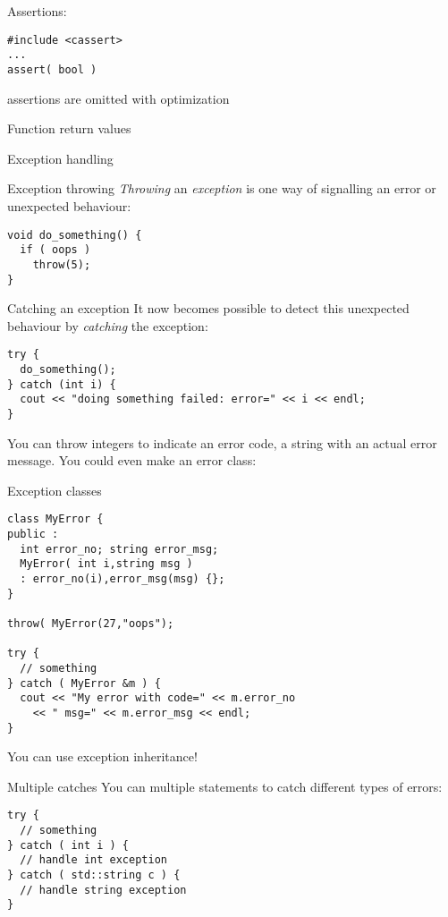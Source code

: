 Assertions:
\begin{verbatim}
#include <cassert>
...
assert( bool )
\end{verbatim}
assertions are omitted with optimization

Function return values

 {Exception handling}

\begin{block}{Exception throwing}
  \label{sl:exception-throw}
  \emph{Throwing} an \emph{exception}%
   is one way of signalling an error or
  unexpected behaviour:
\begin{verbatim}
void do_something() {
  if ( oops )
    throw(5);
}
\end{verbatim}
\end{block}

\begin{block}{Catching an exception}
  \label{sl:exception-catch}
  It now becomes possible to detect this unexpected behaviour by
  \emph{catching}
  the exception:
\begin{verbatim}
try {
  do_something();
} catch (int i) {
  cout << "doing something failed: error=" << i << endl;
}
\end{verbatim}
\end{block}

You can throw integers to indicate an error code, a string with an
actual error message. You could even make an error class:

\begin{block}{Exception classes}
  \label{sl:exception-class}
\begin{verbatim}
class MyError {
public :
  int error_no; string error_msg;
  MyError( int i,string msg )
  : error_no(i),error_msg(msg) {};
}

throw( MyError(27,"oops");

try {
  // something
} catch ( MyError &m ) {
  cout << "My error with code=" << m.error_no
    << " msg=" << m.error_msg << endl;
}
\end{verbatim}
You can use exception inheritance!
\end{block}

\begin{block}{Multiple catches}
  \label{sl:exception-catches}
  You can multiple  statements to catch different types of
  errors:
\begin{verbatim}
try {
  // something
} catch ( int i ) {
  // handle int exception
} catch ( std::string c ) {
  // handle string exception
}
\end{verbatim}
\end{block}

